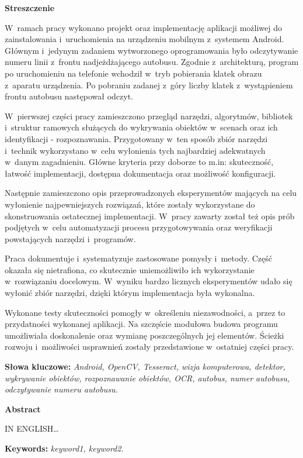 \begin{center}
	\textbf{Streszczenie}
\end{center}

W~ramach pracy wykonano projekt oraz implementację aplikacji możliwej do zainstalowania 
i~uruchomienia
na urządzeniu mobilnym z~systemem Android. Głównym i~jedynym 
zadaniem wytworzonego oprogramowania
było odczytywanie numeru linii z~frontu nadjeżdżającego autobusu.
Zgodnie z~architekturą, program po uruchomieniu na telefonie
wchodził w~tryb pobierania klatek obrazu z~aparatu urządzenia. 
Po pobraniu zadanej z~góry liczby klatek z~wystąpieniem frontu
autobusu następował odczyt.

W~pierwszej części pracy zamieszczono przegląd narzędzi, algorytmów,
bibliotek i~struktur ramowych służących do wykrywania obiektów w~scenach
oraz ich identyfikacji - rozpoznawania. Przygotowany w~ten sposób
zbiór narzędzi i~technik wykorzystano w~celu wyłonienia tych najbardziej
adekwatnych w~danym zagadnieniu. Główne kryteria przy doborze to m.in:
skuteczność, łatwość implementacji, dostępna dokumentacja oraz możliwość
konfiguracji.

Następnie zamieszczono opis przeprowadzonych eksperymentów
mających na celu wyłonienie najpewniejszych rozwiązań, które
zostały wykorzystane do skonstruowania ostatecznej implementacji.
W~pracy zawarty został też opis prób podjętych w~celu automatyzacji
procesu przygotowywania oraz weryfikacji powstających narzędzi 
i~programów.

Praca dokumentuje i~systematyzuje zastosowane pomysły i~metody.
Część okazała się nietrafiona, co skutecznie uniemożliwiło ich
wykorzystanie w~rozwiązaniu docelowym. W~wyniku
bardzo licznych eksperymentów udało się wyłonić zbiór 
narzędzi, dzięki którym implementacja była wykonalna.

Wykonane testy skuteczności pomogły w~określeniu niezawodności,
a~przez to przydatności wykonanej aplikacji. Na szczęście
modułowa budowa programu umożliwiała doskonalenie oraz
wymianę poszczególnych jej elementów. Ścieżki rozwoju
i~możliwości usprawnień zostały przedstawione w~ostatniej
części pracy.


\vspace*{\baselineskip}

\noindent\textbf{Słowa kluczowe:} \textit{Android, OpenCV, Tesseract,
wizja komputerowa, detektor, wykrywanie obiektów, rozpoznawanie obiektów,
OCR, autobus, numer autobusu, odczytywanie numeru autobusu.}

\vspace*{2\baselineskip}

\begin{center}
	\textbf{Abstract}
\end{center}

IN ENGLISH\ldots 

\vspace*{\baselineskip}

\noindent\textbf{Keywords:} \textit{keyword1, keyword2.}

\setcounter{page}{2}
